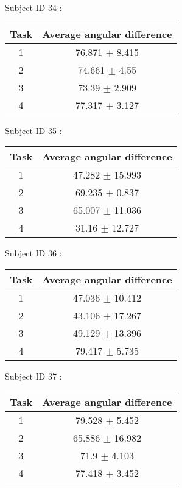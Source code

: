 \documentclass[12pt]{article}
\begin{document}
\par Subject ID  34 :
\begin{center}
\begin{tabular}{|c|c|}
\hline
 Task & Average angular difference \\ \hline
1  &  76.871 $\pm$ 8.415 \\
2  &  74.661 $\pm$ 4.55 \\
3  &  73.39 $\pm$ 2.909 \\
4  &  77.317 $\pm$ 3.127 \\
\hline
\end{tabular}
\end{center}

\par Subject ID  35 :
\begin{center}
\begin{tabular}{|c|c|}
\hline
 Task & Average angular difference \\ \hline
1  &  47.282 $\pm$ 15.993 \\
2  &  69.235 $\pm$ 0.837 \\
3  &  65.007 $\pm$ 11.036 \\
4  &  31.16 $\pm$ 12.727 \\
\hline
\end{tabular}
\end{center}

\par Subject ID  36 :
\begin{center}
\begin{tabular}{|c|c|}
\hline
 Task & Average angular difference \\ \hline
1  &  47.036 $\pm$ 10.412 \\
2  &  43.106 $\pm$ 17.267 \\
3  &  49.129 $\pm$ 13.396 \\
4  &  79.417 $\pm$ 5.735 \\
\hline
\end{tabular}
\end{center}

\par Subject ID  37 :
\begin{center}
\begin{tabular}{|c|c|}
\hline
 Task & Average angular difference \\ \hline
1  &  79.528 $\pm$ 5.452 \\
2  &  65.886 $\pm$ 16.982 \\
3  &  71.9 $\pm$ 4.103 \\
4  &  77.418 $\pm$ 3.452 \\
\hline
\end{tabular}
\end{center}
\end{document}
